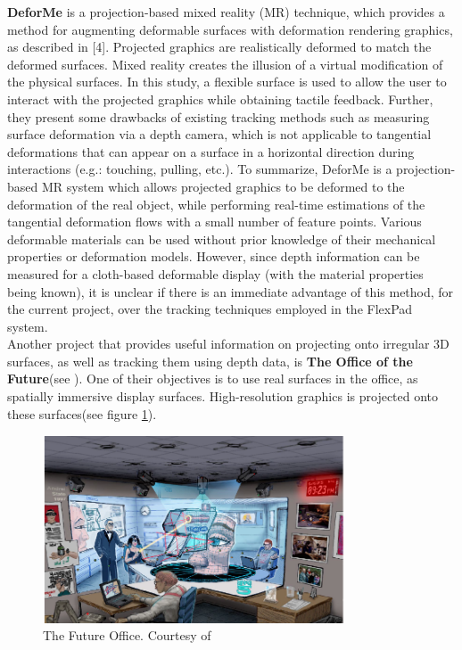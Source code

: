 \documentclass[]{article}
\begin{document}
\textbf{DeforMe} is a projection-based mixed reality (MR) technique, which provides a method for augmenting deformable surfaces with deformation rendering graphics, as described in [4]. Projected graphics are realistically deformed to match the deformed surfaces. Mixed reality creates the illusion of a virtual modification of the physical surfaces. In this study, a flexible surface is used to allow the user to interact with the projected graphics while obtaining tactile feedback. Further, they present some drawbacks of existing tracking methods such as measuring surface deformation via a depth camera, which is not applicable to tangential deformations that can appear on a surface in a horizontal direction during interactions (e.g.: touching, pulling, etc.). To summarize, DeforMe is a projection-based MR system which allows projected graphics to be deformed to the deformation of the real object, while performing real-time estimations of the tangential deformation flows with a small number of feature points. Various deformable materials can be used without prior knowledge of their mechanical properties or deformation models. However, since depth information can be measured for a cloth-based deformable display (with the material properties being known), it is unclear if there is an immediate advantage of this method, for the current project, over the tracking techniques employed in the FlexPad system.\\

Another project that provides useful information on projecting onto irregular 3D surfaces, as well as tracking them using depth data, is \textbf{The Office of the Future}(see \cite{raskar98}). One of their objectives is to use real surfaces in the office, as spatially immersive display surfaces. High-resolution graphics is projected onto these surfaces(see figure \ref{fig:future_office}).

\begin{figure}[hbtp]
    \centering
    \includegraphics[width=0.8\textwidth]{figures/FutureOffice.PNG}
    \caption{The Future Office. Courtesy of \cite{raskar98}}
    \label{fig:future_office}
\end{figure}
\end{document}
